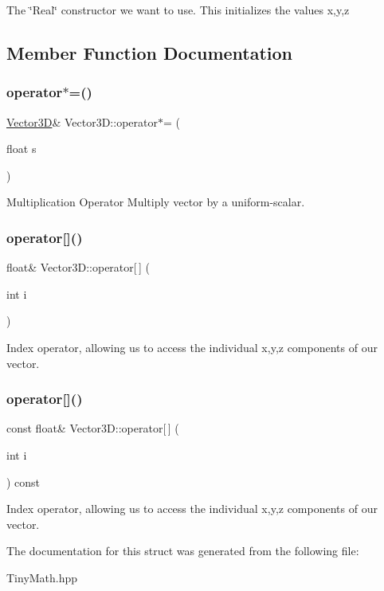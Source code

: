 The \char`\"{}\+Real\char`\"{} constructor we want to use. This initializes the values x,y,z 

\subsection{Member Function Documentation}
\mbox{\label{structVector3D_a83d5f64613f79d60e080dc04689f1c2b}} 
\subsubsection{\texorpdfstring{operator$\ast$=()}{operator*=()}}
{\footnotesize\ttfamily \hyperlink{structVector3D}{Vector3D}\& Vector3\+D\+::operator$\ast$= (\begin{DoxyParamCaption}\item[{float}]{s }\end{DoxyParamCaption})\hspace{0.3cm}{\ttfamily [inline]}}

Multiplication Operator Multiply vector by a uniform-\/scalar. \mbox{\label{structVector3D_a9ada0b9382fdaf3bade67438f829280d}} 
\subsubsection{\texorpdfstring{operator[]()}{operator[]()}\hspace{0.1cm}{\footnotesize\ttfamily [1/2]}}
{\footnotesize\ttfamily float\& Vector3\+D\+::operator\mbox{[}$\,$\mbox{]} (\begin{DoxyParamCaption}\item[{int}]{i }\end{DoxyParamCaption})\hspace{0.3cm}{\ttfamily [inline]}}

Index operator, allowing us to access the individual x,y,z components of our vector. \mbox{\label{structVector3D_aeb8dfce8e40587899758e9f7d5752dc6}} 
\subsubsection{\texorpdfstring{operator[]()}{operator[]()}\hspace{0.1cm}{\footnotesize\ttfamily [2/2]}}
{\footnotesize\ttfamily const float\& Vector3\+D\+::operator\mbox{[}$\,$\mbox{]} (\begin{DoxyParamCaption}\item[{int}]{i }\end{DoxyParamCaption}) const\hspace{0.3cm}{\ttfamily [inline]}}

Index operator, allowing us to access the individual x,y,z components of our vector. 

The documentation for this struct was generated from the following file\+:\begin{DoxyCompactItemize}
\item 
Tiny\+Math.\+hpp\end{DoxyCompactItemize}
